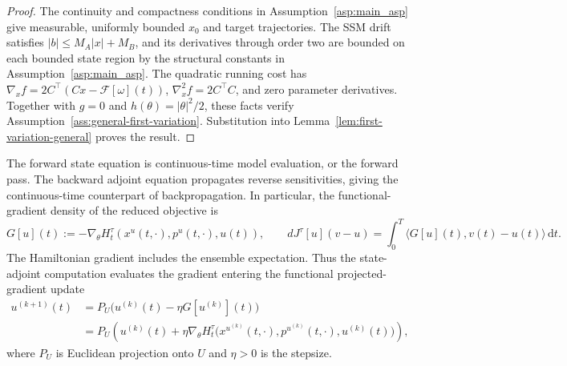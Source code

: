 \documentclass[11pt]{amsart}
\numberwithin{equation}{section} %
\newcommand{\dd}{\mathrm{d}}
\theoremstyle{remark}
\begin{document}
\begin{proof}
The continuity and compactness conditions in
Assumption~\ref{asp:main_asp} give measurable, uniformly bounded
$x_0$ and target trajectories. The SSM drift satisfies
$|b|\le M_A|x|+M_B$, and its derivatives through order two are
bounded on each bounded state region by the structural constants
in Assumption~\ref{asp:main_asp}. The quadratic running cost has
$\nabla_x f=2C^\top(Cx-\mathcal F[\omega](t))$,
$\nabla_x^2 f=2C^\top C$, and zero parameter derivatives.
Together with $g=0$ and $h(\theta)=|\theta|^2/2$, these facts verify
Assumption~\ref{ass:general-first-variation}. Substitution into
Lemma~\ref{lem:first-variation-general} proves the result. 
\end{proof}

The forward state equation is continuous-time model evaluation, or
the forward pass. The backward adjoint equation propagates reverse
sensitivities, giving the continuous-time counterpart of
backpropagation. In particular, the functional-gradient density of the reduced objective is
\begin{equation}
\label{eq:training-gradient-density}
G[u](t):=-\nabla_\theta H_t^\tau(x^u(t,\cdot),p^u(t,\cdot),u(t)),
\qquad
dJ^\tau[u](v-u)=\int_0^T\langle G[u](t),v(t)-u(t)\rangle\,\dd t.
\end{equation}
The Hamiltonian gradient includes the ensemble expectation.
Thus the state-adjoint computation evaluates the gradient entering
the functional projected-gradient update
\begin{equation}
\label{eq:ssm-projected-gradient-update}
\begin{aligned}
u^{(k+1)}(t)
&=P_U\bigl(u^{(k)}(t)-\eta G[u^{(k)}](t)\bigr)\\
&=P_U\!\left(u^{(k)}(t)+\eta\nabla_\theta H_t^\tau
\bigl(x^{u^{(k)}}(t,\cdot),p^{u^{(k)}}(t,\cdot),u^{(k)}(t)\bigr)\right),
\end{aligned}
\end{equation}
where $P_U$ is Euclidean projection onto $U$ and $\eta>0$ is the
stepsize.
\end{document}
